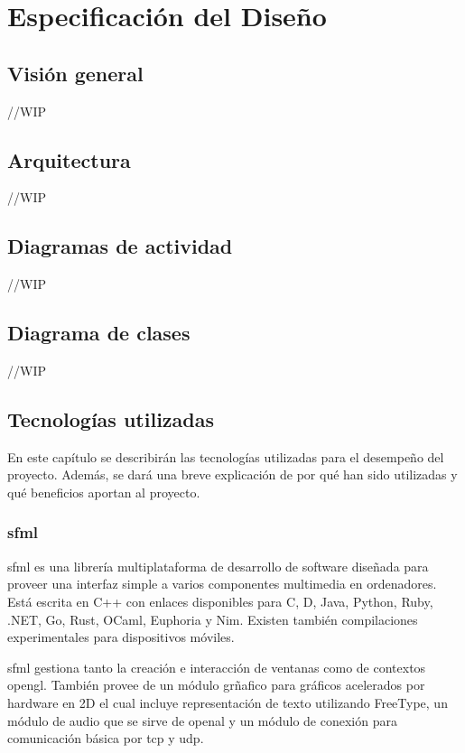 \chapter{Especificación del Diseño}

\section{Visión general}

	//WIP

\section{Arquitectura}

	//WIP

\section{Diagramas de actividad}

	//WIP

\section{Diagrama de clases}
	
	//WIP

\section{Tecnologías utilizadas}

	En este capítulo se describirán las tecnologías utilizadas para el desempeño del proyecto. Además, se dará una breve explicación de por qué han sido utilizadas y qué beneficios aportan al proyecto.

	\subsection{\acrshort{sfml}}

		\acrfull{sfml} es una librería multiplataforma de desarrollo de software diseñada para proveer una interfaz simple a varios componentes multimedia en ordenadores. Está escrita en C++ con enlaces disponibles para C, D, Java, Python, Ruby, .NET, Go, Rust, OCaml, Euphoria y Nim. Existen también compilaciones experimentales para dispositivos móviles.

		\acrshort{sfml} gestiona tanto la creación e interacción de ventanas como de contextos \acrshort{opengl}. También provee de un módulo grñafico para gráficos acelerados por hardware en 2D el cual incluye representación de texto utilizando FreeType, un módulo de audio que se sirve de \acrshort{openal} y un módulo de conexión para comunicación básica por \acrshort{tcp} y \acrshort{udp}.

